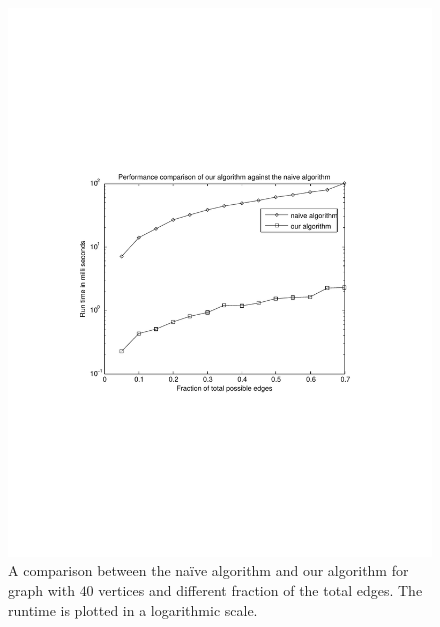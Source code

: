 \documentclass[10pt,letterpaper]{article}
\begin{document}
\begin{figure}[!t]
\centering
\includegraphics[scale=1.0, width=\columnwidth]{Fig2.pdf}
\vspace{-4cm}
\caption{A comparison between the na\"ive algorithm and our algorithm for graph with $40$ vertices
         and different fraction of the total edges. The runtime is plotted in a logarithmic scale.} 
\label{fig1}
\end{figure}
\end{document}
